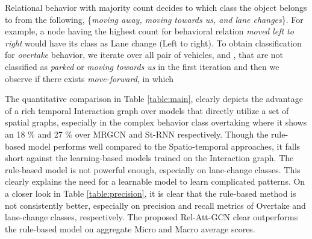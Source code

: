 \documentclass[letterpaper, 10 pt, conference]{ieeeconf}
\begin{document}
Relational behavior with majority count decides to which class the object belongs to from the following, \{\textit{moving away, moving towards us, and lane changes}\}. For example, a node having the highest count for behavioral relation \textit{moved left to right} would have its class as Lane change (Left to right). To obtain classification for \textit{overtake} behavior, we iterate over all pair of vehicles,  and , that are not classified as \textit{parked} or \textit{moving towards us} in the first iteration and then we observe if there exists  \textit{move-forward}, in which

The quantitative comparison in Table \ref{table:main}, clearly depicts the advantage of a rich temporal Interaction graph over models that directly utilize a set of spatial graphs, especially in the complex behavior class overtaking where it shows an 18 \% and 27 \% over MRGCN and St-RNN respectively. Though the rule-based model performs well compared to the Spatio-temporal approaches, it falls short against the learning-based models trained on the Interaction graph. The rule-based model is not powerful enough, especially on lane-change classes. This clearly explains the need for a learnable model to learn complicated patterns. On a closer look in Table \ref{table:precision}, it is clear that the rule-based method is not consistently better, especially on precision and recall metrics of Overtake and lane-change classes, respectively. The proposed Rel-Att-GCN clear outperforms the rule-based model on aggregate Micro and Macro average scores.
\end{document}
